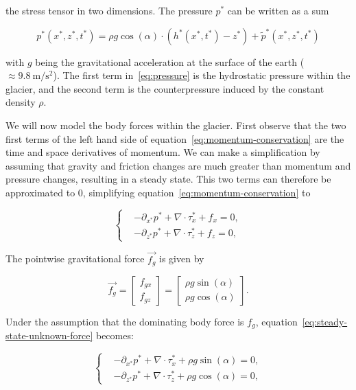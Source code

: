 the stress tensor in two dimensions. The pressure $p^*$ can be written as a sum

\begin{equation} \label{eq:pressure}
  p^*(x^*, z^*, t^*) = \rho g \cos(\alpha) \cdot (h^*(x^*, t^*) - z^*) + \tilde{p}^*(x^*, z^*, t^*)
\end{equation}

with $g$ being the gravitational acceleration at the surface of the earth ($\approx \SI{9.8}{\meter\per\square\second}$). The first term in~\eqref{eq:pressure} is the hydrostatic pressure within the glacier, and the second term is the counterpressure induced by the constant density $\rho$.

We will now model the body forces within the glacier. First observe that the two first terms of the left hand side of equation~\eqref{eq:momentum-conservation} are the time and space derivatives of momentum.
We can make a simplification by assuming that gravity and friction changes are much greater than momentum and pressure changes, resulting in a steady state. This two terms can therefore be approximated to $0$, simplifying equation~\eqref{eq:momentum-conservation} to

\begin{equation} \label{eq:steady-state-unknown-force}
  \begin{cases}
    &-\partial_{x^*} p^* + \nabla \cdot \tau_x^* + f_x = 0, \\
    &-\partial_{z^*} p^* + \nabla \cdot \tau_z^* + f_z = 0,
  \end{cases}
\end{equation}

The pointwise gravitational force $\vec{f_g}$ is given by

\begin{equation}
  \vec{f_g} = \begin{bmatrix} f_{gx} \\ f_{gz} \end{bmatrix} = \begin{bmatrix} \rho g \sin(\alpha) \\ \rho g \cos(\alpha) \end{bmatrix}.
\end{equation}

Under the assumption that the dominating body force is $f_g$, equation~\eqref{eq:steady-state-unknown-force} becomes:

\begin{equation} \label{eq:steady-state-implicit}
  \begin{cases}
    &-\partial_{x^*} p^* + \nabla \cdot \tau_x^* + \rho g \sin(\alpha) = 0, \\
    &-\partial_{z^*} p^* + \nabla \cdot \tau_z^* + \rho g \cos(\alpha) = 0,
  \end{cases}
\end{equation}

